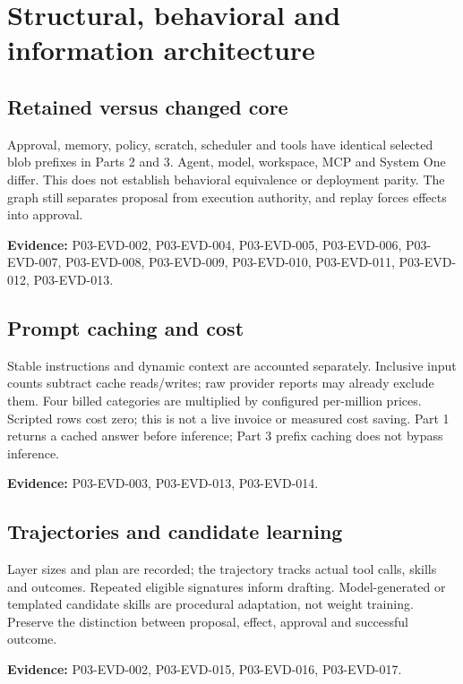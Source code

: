 \documentclass[10pt,letterpaper]{article}
\begin{document}
\section{Structural, behavioral and information architecture}
\subsection{Retained versus changed core}
Approval, memory, policy, scratch, scheduler and tools have identical selected blob prefixes in Parts 2 and 3. Agent, model, workspace, MCP and System One differ. This does not establish behavioral equivalence or deployment parity. The graph still separates proposal from execution authority, and replay forces effects into approval.\par\textbf{Evidence:} P03-EVD-002, P03-EVD-004, P03-EVD-005, P03-EVD-006, P03-EVD-007, P03-EVD-008, P03-EVD-009, P03-EVD-010, P03-EVD-011, P03-EVD-012, P03-EVD-013.\par

\subsection{Prompt caching and cost}
Stable instructions and dynamic context are accounted separately. Inclusive input counts subtract cache reads/writes; raw provider reports may already exclude them. Four billed categories are multiplied by configured per-million prices. Scripted rows cost zero; this is not a live invoice or measured cost saving. Part 1 returns a cached answer before inference; Part 3 prefix caching does not bypass inference.\par\textbf{Evidence:} P03-EVD-003, P03-EVD-013, P03-EVD-014.\par

\subsection{Trajectories and candidate learning}
Layer sizes and plan are recorded; the trajectory tracks actual tool calls, skills and outcomes. Repeated eligible signatures inform drafting. Model-generated or templated candidate skills are procedural adaptation, not weight training. Preserve the distinction between proposal, effect, approval and successful outcome.\par\textbf{Evidence:} P03-EVD-002, P03-EVD-015, P03-EVD-016, P03-EVD-017.\par
\end{document}
